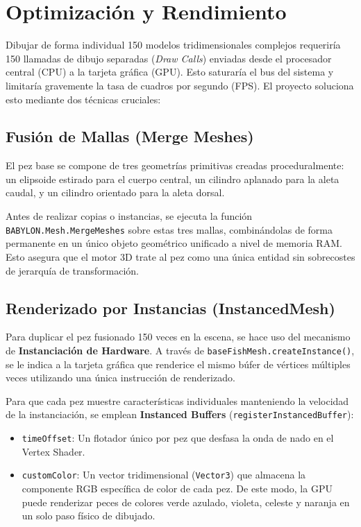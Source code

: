 \documentclass[12pt,a4paper]{article}
\begin{document}
\newpage
\section{Optimización y Rendimiento}
Dibujar de forma individual 150 modelos tridimensionales complejos requeriría 150 llamadas de dibujo separadas (\textit{Draw Calls}) enviadas desde el procesador central (CPU) a la tarjeta gráfica (GPU). Esto saturaría el bus del sistema y limitaría gravemente la tasa de cuadros por segundo (FPS). El proyecto soluciona esto mediante dos técnicas cruciales:

\subsection{Fusión de Mallas (Merge Meshes)}
El pez base se compone de tres geometrías primitivas creadas proceduralmente: un elipsoide estirado para el cuerpo central, un cilindro aplanado para la aleta caudal, y un cilindro orientado para la aleta dorsal. 

Antes de realizar copias o instancias, se ejecuta la función \texttt{BABYLON.Mesh.MergeMeshes} sobre estas tres mallas, combinándolas de forma permanente en un único objeto geométrico unificado a nivel de memoria RAM. Esto asegura que el motor 3D trate al pez como una única entidad sin sobrecostes de jerarquía de transformación.

\subsection{Renderizado por Instancias (InstancedMesh)}
Para duplicar el pez fusionado 150 veces en la escena, se hace uso del mecanismo de \textbf{Instanciación de Hardware}. A través de \texttt{baseFishMesh.createInstance()}, se le indica a la tarjeta gráfica que renderice el mismo búfer de vértices múltiples veces utilizando una única instrucción de renderizado.

Para que cada pez muestre características individuales manteniendo la velocidad de la instanciación, se emplean \textbf{Instanced Buffers} (\texttt{registerInstancedBuffer}):
\begin{itemize}
    \item \texttt{timeOffset}: Un flotador único por pez que desfasa la onda de nado en el Vertex Shader.
    \item \texttt{customColor}: Un vector tridimensional (\texttt{Vector3}) que almacena la componente RGB específica de color de cada pez. De este modo, la GPU puede renderizar peces de colores verde azulado, violeta, celeste y naranja en un solo paso físico de dibujado.
\end{itemize}
\end{document}
